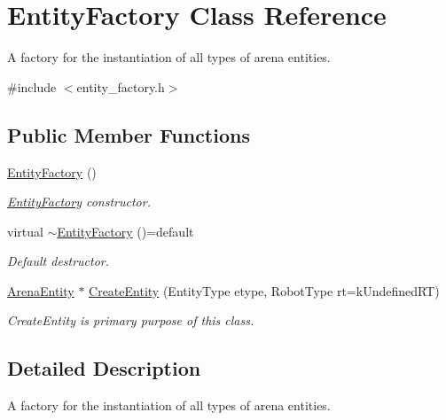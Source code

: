 \hypertarget{class_entity_factory}{}\section{Entity\+Factory Class Reference}
\label{class_entity_factory}


A factory for the instantiation of all types of arena entities.  




{\ttfamily \#include $<$entity\+\_\+factory.\+h$>$}

\subsection*{Public Member Functions}
\begin{DoxyCompactItemize}
\item 
\mbox{\label{class_entity_factory_abaf0c4ceaa682e55f69b0ceae230008a}} 
\mbox{\hyperlink{class_entity_factory_abaf0c4ceaa682e55f69b0ceae230008a}{Entity\+Factory}} ()
\begin{DoxyCompactList}\small\item\em \mbox{\hyperlink{class_entity_factory}{Entity\+Factory}} constructor. \end{DoxyCompactList}\item 
\mbox{\label{class_entity_factory_ae3246f06fa101178803f76582323d4ad}} 
virtual \mbox{\hyperlink{class_entity_factory_ae3246f06fa101178803f76582323d4ad}{$\sim$\+Entity\+Factory}} ()=default
\begin{DoxyCompactList}\small\item\em Default destructor. \end{DoxyCompactList}\item 
\mbox{\hyperlink{class_arena_entity}{Arena\+Entity}} $\ast$ \mbox{\hyperlink{class_entity_factory_a2a41674ef60c634ef8f886ead99b7b12}{Create\+Entity}} (Entity\+Type etype, Robot\+Type rt=k\+Undefined\+RT)
\begin{DoxyCompactList}\small\item\em Create\+Entity is primary purpose of this class. \end{DoxyCompactList}\end{DoxyCompactItemize}


\subsection{Detailed Description}
A factory for the instantiation of all types of arena entities. 

